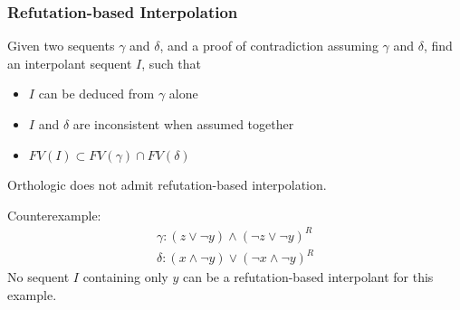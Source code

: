 \documentclass[
    aspectratio=169,
    xcolor={dvipsnames},
]{beamer}
\begin{document}
\begin{frame}
    \frametitle{Refutation-based Interpolation}


    Given two sequents \(\gamma\) and \(\delta\), and a proof of contradiction assuming
    \(\gamma\) and \(\delta\), find an interpolant sequent \(I\), such that

    \begin{itemize}[<+->]
        \item \(I\) can be deduced from \(\gamma\) alone
        \item \(I\) and \(\delta\) are inconsistent when assumed together
        \item \(FV(I) \subset FV(\gamma) \cap FV(\delta)\)
    \end{itemize}


    

    \pause
    \begin{theorem}
        Orthologic does not admit refutation-based interpolation.
    \end{theorem}

    \pause

    Counterexample: 
    \begin{gather*}
        \gamma: (z \lor \neg y) \land (\neg z \lor \neg y)^R \\
        \delta: (x \land \neg y) \lor (\neg x \land \neg y)^R
    \end{gather*}
    \pause
    No sequent \(I\) containing only \(y\) can be a refutation-based interpolant
    for this example.

\end{frame}
\end{document}
